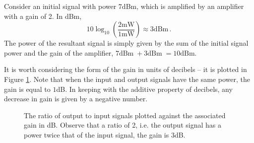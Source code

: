%
\begin{exmp}
  Consider an initial signal with power $7$dBm, which is amplified by an amplifier with
  a gain of 2. In dBm,
  \begin{displaymath}
    10\log_{10}\left(\frac{2\mathrm{mW}}{1\mathrm{mW}}\right) \approx 3\mathrm{dBm} \,.
  \end{displaymath}
  The power of the resultant signal is simply given by the sum of the initial signal power
  and the gain of the amplifier, $7\mathrm{dBm}\; + 3\mathrm{dBm}\; = 10\mathrm{dBm}$.
\end{exmp}
%
It is worth considering the form of the gain in units of decibels -- it is plotted
in Figure \ref{fig::appendix_1_decibels}. Note that when the input and output signals
have the same power, the gain is equal to $1$dB. In keeping with the additive property
of decibels, any decrease in gain is given by a negative number.
%
\begin{figure}[!htb]
  \caption{The ratio of output to input signals plotted against the associated
    gain in dB. Observe that a ratio of 2, i.e. the output signal has a power twice
    that of the input signal, the gain is 3dB.}
  \label{fig::appendix_1_decibels}
\end{figure}

